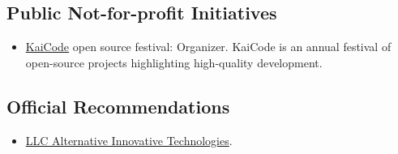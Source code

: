 \documentclass{vl}
\begin{document}
    \subsection*{Public Not-for-profit Initiatives}
    \begin{itemize}
        \item \href{https://www.kaicode.org}{KaiCode} open source festival: Organizer.
        KaiCode is an annual festival of open-source projects highlighting high-quality development.
    \end{itemize}
    \subsection*{Official Recommendations}
    \begin{itemize}
        \item \href{https://github.com/volodya-lombrozo/volodya-lombrozo.github.io/blob/24eb2bbed8fac71c90ddef6ff4d93de8fb4f9f26/_cv/recommendations/letter_of_recommendation_ait.pdf}{LLC Alternative Innovative Technologies}.
    \end{itemize}
\end{document}
